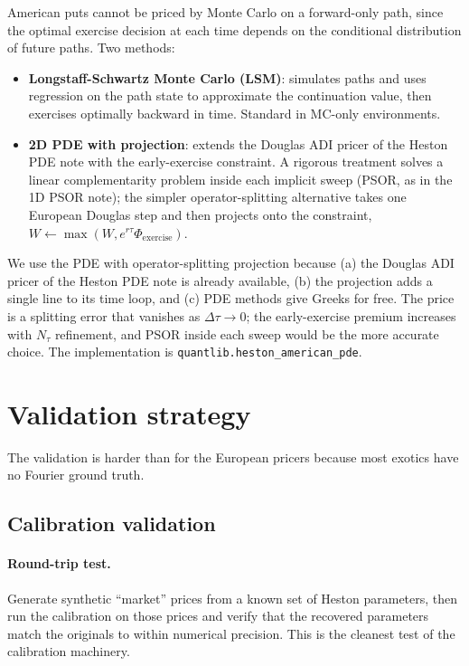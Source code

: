 \documentclass[11pt]{article}
\theoremstyle{plain}
\theoremstyle{definition}
\theoremstyle{remark}
\begin{document}
American puts cannot be priced by Monte Carlo on a forward-only path, since the optimal exercise decision at each time depends on the conditional distribution of future paths. Two methods:
\begin{itemize}[topsep=2pt]
    \item \textbf{Longstaff-Schwartz Monte Carlo (LSM)}: simulates paths and uses regression on the path state to approximate the continuation value, then exercises optimally backward in time. Standard in MC-only environments.
    \item \textbf{2D PDE with projection}: extends the Douglas ADI pricer of the Heston PDE note with the early-exercise constraint. A rigorous treatment solves a linear complementarity problem inside each implicit sweep (PSOR, as in the 1D PSOR note); the simpler operator-splitting alternative takes one European Douglas step and then projects onto the constraint, $W \leftarrow \max(W, e^{r\tau}\Phi_{\mathrm{exercise}})$.
\end{itemize}
We use the PDE with operator-splitting projection because (a) the Douglas ADI pricer of the Heston PDE note is already available, (b) the projection adds a single line to its time loop, and (c) PDE methods give Greeks for free. The price is a splitting error that vanishes as $\Delta\tau \to 0$; the early-exercise premium increases with $N_\tau$ refinement, and PSOR inside each sweep would be the more accurate choice. The implementation is \texttt{quantlib.heston\_american\_pde}.

\section{Validation strategy}
\label{sec:validation}

The validation is harder than for the European pricers because most exotics have no Fourier ground truth.

\subsection{Calibration validation}
\label{sec:cal-validation}

\paragraph{Round-trip test.} Generate synthetic ``market'' prices from a known set of Heston parameters, then run the calibration on those prices and verify that the recovered parameters match the originals to within numerical precision. This is the cleanest test of the calibration machinery.
\end{document}
